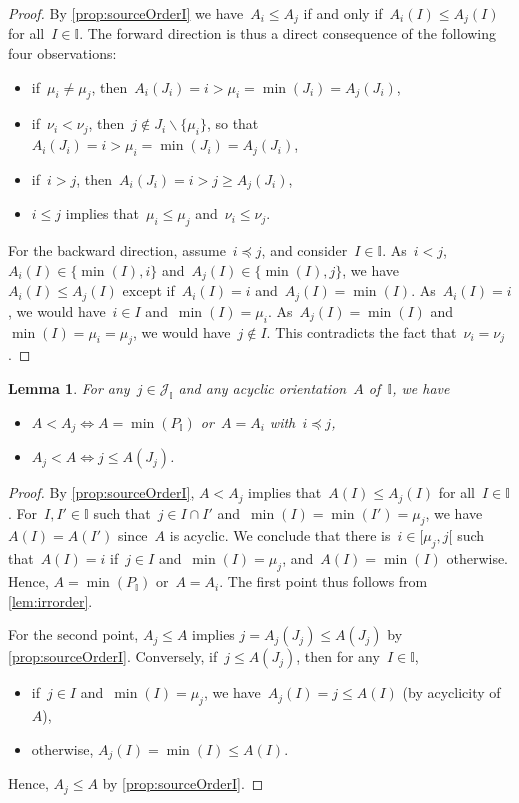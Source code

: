 \documentclass[reqno]{amsart}
\newtheorem{lemma}[theorem]{Lemma}
\theoremstyle{definition}
\newcommand{\cal}[1]{\mathcal{#1}} %
\newcommand{\ssm}{\smallsetminus} %
\newcommand{\II}{\mathbb I} %
\newcommand{\cJ}{\cal{J}} %
\begin{document}
\begin{proof}
By \cref{prop:sourceOrderI} we have~$A_i \le A_j$ if and only if~$A_i(I) \le A_j(I)$ for all~$I \in \II$.
%
The forward direction is thus a direct consequence of the following four observations:
\begin{itemize}
\item if~$\mu_i \ne \mu_j$, then~$A_i(J_i) = i > \mu_i = \min(J_i) = A_j(J_i)$,
\item if~$\nu_i < \nu_j$, then~$j \notin J_i \ssm \{\mu_i\}$, so that~$A_i(J_i) = i > \mu_i = \min(J_i) = A_j(J_i)$,
\item if~$i > j$, then~$A_i(J_i) = i > j \ge A_j(J_i)$,
\item $i \le j$ implies that~$\mu_i \le \mu_j$ and~$\nu_i \le \nu_j$.
\end{itemize}
%
For the backward direction, assume~$i \preccurlyeq j $, and consider~$I \in \II$.
As~$i < j$, $A_i(I) \in \{\min(I), i\}$ and~$A_j(I) \in \{\min(I), j\}$, we have~$A_i(I) \le A_j(I)$ except if~$A_i(I) = i$ and~$A_j(I) = \min(I)$.
As~$A_i(I) = i$, we would have~$i \in I$ and~$\min(I) = \mu_i$. As~$A_j(I) = \min(I)$ and~$\min(I) = \mu_i = \mu_j$, we would have~$j \notin I$.
This contradicts the fact that~$\nu_i = \nu_j$.
\end{proof}

\begin{lemma}
\label{lem:subirr}
For any~$j \in \cJ_\II$ and any acyclic orientation~$A$ of~$\II$, we have
\begin{itemize}
\item $A < A_j \iff A = \min(P_\II)$ or~$A = A_i$ with~$i \preccurlyeq j$,
\item $A_j < A \iff j \le A(J_j)$.
\end{itemize}
\end{lemma}

\begin{proof}
By \cref{prop:sourceOrderI}, $A < A_j$ implies that~$A(I) \le A_j(I)$ for all~$I \in \II$.
For~$I, I' \in \II$ such that~$j \in I \cap I'$ and~$\min(I) = \min(I') = \mu_j$, we have~$A(I) = A(I')$ since~$A$ is acyclic.
We conclude that there is~$i \in {[\mu_j, j[}$ such that~$A(I) = i$ if~$j \in I$ and~$\min(I) = \mu_j$, and~$A(I) = \min(I)$ otherwise.
Hence, $A = \min(P_\II)$ or~$A = A_i$.
The first point thus follows from \cref{lem:irrorder}.

For the second point, $A_j \le A$ implies $j = A_j(J_j) \le A(J_j)$ by \cref{prop:sourceOrderI}.
Conversely, if~$j \le A(J_j)$, then for any~$I \in \II$,
\begin{itemize}
\item if~$j \in I$ and~$\min(I) = \mu_j$, we have~$A_j(I) = j \le A(I)$ (by acyclicity of~$A$),
\item otherwise, $A_j(I) = \min(I) \le A(I)$.
\end{itemize}
Hence, $A_j \le A$ by \cref{prop:sourceOrderI}.
\end{proof}
\end{document}
